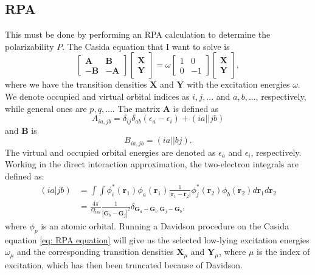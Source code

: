 \documentclass[12pt]{article}
\begin{document}
\subsection{RPA}
This must be done by performing an RPA calculation to determine the polarizability $P$.
The Casida equation that I want to solve is
\begin{equation}
\begin{bmatrix}
\textbf{A} & \textbf{B} \\
-\textbf{B} & -\textbf{A}
\end{bmatrix}
\begin{bmatrix}
\textbf{X} \\
\textbf{Y}
\end{bmatrix}
=
\omega 
\begin{bmatrix}
1 & 0 \\
0 & -1
\end{bmatrix}
\begin{bmatrix}
\textbf{X} \\
\textbf{Y}
\end{bmatrix},
\label{eq: RPA equation}
\end{equation}
where we have the transition densities $\textbf{X}$ and $\textbf{Y}$ with the excitation energies $\omega$. We denote occupied and virtual orbital indices as $i,j,...$ and $a,b,...$, respectively, while general ones are $p,q,...$.
The matrix
$\textbf{A}$ is defined as
\begin{equation}
    A_{ia,jb} = \delta _{ij}\delta _{ab}(\epsilon _{a}- \epsilon _{i}) + (ia||jb)
\label{eq: A matrix RPA}
\end{equation}
and $\textbf{B}$ is
\begin{equation}
    B_{ia,jb} = (ia||bj)
\label{eq: B matrix RPA}.
\end{equation}
The virtual and occupied orbital energies are denoted as $\epsilon _{a}$ and $\epsilon _{i}$, respectively. Working in the direct interaction approximation, the two-electron integrals are defined as:
\begin{align}
    (ia|jb) &= \int \int \phi _{i}^{*}(\mathbf{r}_{1})\phi _{a}(\mathbf{r}_{1})\frac{1}{|\mathbf{r}_{1}-\mathbf{r}_{2}|}\phi _{j}^{*}(\mathbf{r}_{2})\phi _{b}(\mathbf{r}_{2})d\mathbf{r}_{1}d\mathbf{r}_{2} \\
    &= \frac{4\pi}{\Omega_{vol} }\frac{1}{|\mathbf{G}_{b}-\mathbf{G}_{j}|^{2}}\delta _{\mathbf{G}_{a} - \mathbf{G}_{i}, \mathbf{G}_{j} - \mathbf{G}_{b}},
    \label{eq: two-electron integrals}
\end{align}
where $\phi _{p}$ is an atomic orbital. Running a Davidson procedure on the Casida equation \ref{eq: RPA equation} will give us the selected low-lying excitation energies $\omega_{\mu}$ and the corresponding transition densities $\textbf{X}_{\mu}$ and $\textbf{Y}_{\mu}$, where $\mu$ is the index of excitation, which has then been truncated because of Davidson.
\end{document}
